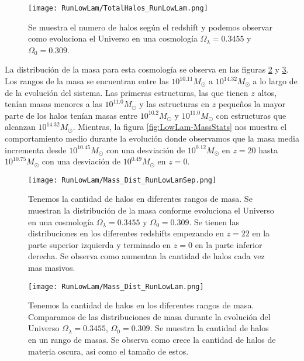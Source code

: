 \begin{figure}[H]
    \centering
    \texttt{[image: RunLowLam/TotalHalos\_RunLowLam.png]}
    \caption[Evolución del número de halos en un Universo $\Omega_\lambda = 0.3455$, $\Omega_0 = 0.309$]{\footnotesize Se muestra el numero de halos según el redshift y podemos observar como evoluciona el Universo en una cosmología $\Omega_\lambda = 0.3455 $ y $\Omega_0 = 0.309$.}
    \label{fig:LowLam_TotalHalos}
\end{figure}

La distribución de la masa para esta cosmología se observa en las figuras \ref{fig:LowLam-MassDistSep} y \ref{fig:LowLam-MassDist}. Los rangos de la masa se encuentran entre las $10^{10.11}M_\odot$ a $10^{14.32}M_\odot$ a lo largo de de la evolución del sistema. Las primeras estructuras, las que tienen $z$ altos, tenían masas menores a las $10^{11.0}M_\odot$ y las estructuras en $z$ pequeños la mayor parte de los halos tenían masas entre $10^{10.2}M_\odot$ y $10^{11.0}M_\odot$ con estructuras que alcanzan $10^{14.32}M_\odot$. Mientras, la figura \ref{fig:LowLam-MassStats} nos muestra el comportamiento medio durante la evolución donde observamos que la masa media incrementa desde $10^{10.45}M_\odot$ con una desviación de $10^{0.12}M_\odot$ en $z=20$ hasta $10^{10.75}M_\odot$ con una desviación de $10^{0.49}M_\odot$ en $z=0$.

\begin{figure}[H]
    \centering
    \texttt{[image: RunLowLam/Mass\_Dist\_RunLowLamSep.png]}
    \caption[Distribución de masa en la evolución de un Universo $\Omega_\lambda = 0.3455$, $\Omega_0 = 0.309$]{\footnotesize Tenemos la cantidad de halos en diferentes rangos de masa. Se muestran la distribución de la masa conforme evoluciona el Universo en una cosmología $\Omega_\lambda = 0.3455$ y $\Omega_0 = 0.309$. Se tienen las distribuciones en los diferentes redshifts empezando en $z=22$ en la parte superior izquierda y terminado en $z=0$ en la parte inferior derecha. Se observa como aumentan la cantidad de halos cada vez mas masivos.}
    \label{fig:LowLam-MassDistSep}
\end{figure}

\begin{figure}[H]
    \centering
    \texttt{[image: RunLowLam/Mass\_Dist\_RunLowLam.png]}
    \caption[Comparación de distribución de masa en un Universo $\Omega_\lambda = 0.3455$, $\Omega_0 = 0.309$]{\footnotesize Tenemos la cantidad de halos en los diferentes rangos de masa. Comparamos de las distribuciones de masa durante la evolución del Universo $\Omega_\lambda = 0.3455$, $\Omega_0 = 0.309$. Se muestra la cantidad de halos en un rango de masas. Se observa como crece la cantidad de halos de materia oscura, asi como el tamaño de estos.}
    \label{fig:LowLam-MassDist}
\end{figure}

